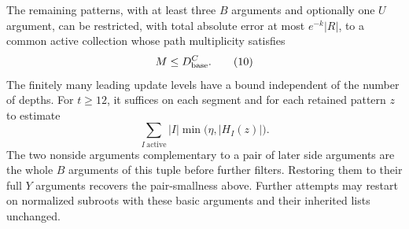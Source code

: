 \begin{proposition}
\label{prop:base-reduction}
The remaining patterns, with at least three $B$
arguments and optionally one $U$ argument, can
be restricted, with total absolute error at
most $e^{-k}|R|$, to a common active collection
whose path multiplicity satisfies
\begin{equation*}
 M\le D_{\rm base}^{C}.
\tag{10}\label{eq:src-10}
\end{equation*}
The finitely many leading update levels have
a bound independent of the number of depths.
For $t\ge12$, it suffices on each segment and
for each retained pattern $z$ to estimate
\begin{equation*}
 \sum_{I\ \mathrm{active}}|I|
                       \min\bigl(\eta,|H_I(z)|\bigr).
\tag{11}\label{eq:src-11}
\end{equation*}
The two nonside arguments complementary to a
pair of later side arguments are the whole
$B$ arguments of this tuple before further
filters.  Restoring them to their full $Y$
arguments recovers the pair-smallness above.
Further attempts may restart on normalized
subroots with these basic arguments and their
inherited lists unchanged.
\end{proposition}

